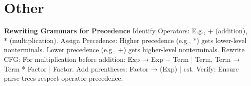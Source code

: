 \section{Other}

\textbf{Rewriting Grammars for Precedence}
Identify Operators: E.g., + (addition), * (multiplication).
Assign Precedence:
Higher precedence (e.g., *) gets lower-level nonterminals.
Lower precedence (e.g., +) gets higher-level nonterminals.
Rewrite CFG:
For multiplication before addition: Exp → Exp + Term | Term, Term → Term * Factor | Factor.
Add parentheses: Factor → (Exp) | cst.
Verify: Ensure parse trees respect operator precedence.
